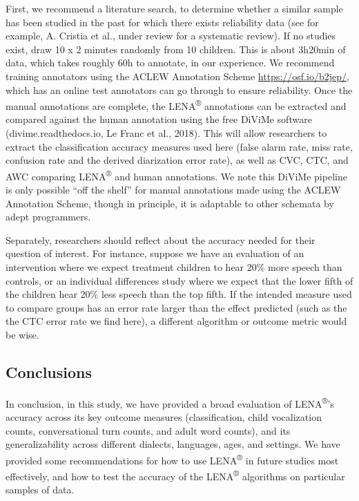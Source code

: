 \documentclass[english,floatsintext,man]{apa6}
\begin{document}
First, we recommend a literature search, to determine whether a similar
sample has been studied in the past for which there exists reliability
data (see for example, A. Cristia et al., under review for a systematic
review). If no studies exist, draw 10 x 2 minutes randomly from 10
children. This is about 3h20min of data, which takes roughly 60h to
annotate, in our experience. We recommend training annotators using the
ACLEW Annotation Scheme \url{https://osf.io/b2jep/}, which has an online
test annotators can go through to ensure reliability. Once the manual
annotations are complete, the LENA\textsuperscript{®} annotations can be
extracted and compared against the human annotation using the free
DiViMe software (divime.readthedocs.io, Le Franc et al., 2018). This
will allow researchers to extract the classification accuracy measures
used here (false alarm rate, miss rate, confusion rate and the derived
diarization error rate), as well as CVC, CTC, and AWC comparing
LENA\textsuperscript{®} and human annotations. We note this DiViMe
pipeline is only possible \enquote{off the shelf} for manual annotations
made using the ACLEW Annotation Scheme, though in principle, it is
adaptable to other schemata by adept programmers.

Separately, researchers should reflect about the accuracy needed for
their question of interest. For instance, suppose we have an evaluation
of an intervention where we expect treatment children to hear 20\% more
speech than controls, or an individual differences study where we expect
that the lower fifth of the children hear 20\% less speech than the top
fifth. If the intended measure used to compare groups has an error rate
larger than the effect predicted (such as the the CTC error rate we find
here), a different algorithm or outcome metric would be wise.

\subsection{Conclusions}\label{conclusions}

In conclusion, in this study, we have provided a broad evaluation of
LENA\textsuperscript{®}'s accuracy across its key outcome measures
(classification, child vocalization counts, conversational turn counts,
and adult word counts), and its generalizability across different
dialects, languages, ages, and settings. We have provided some
recommendations for how to use LENA\textsuperscript{®} in future studies
most effectively, and how to test the accuracy of the
LENA\textsuperscript{®} algorithms on particular samples of data.
\end{document}
